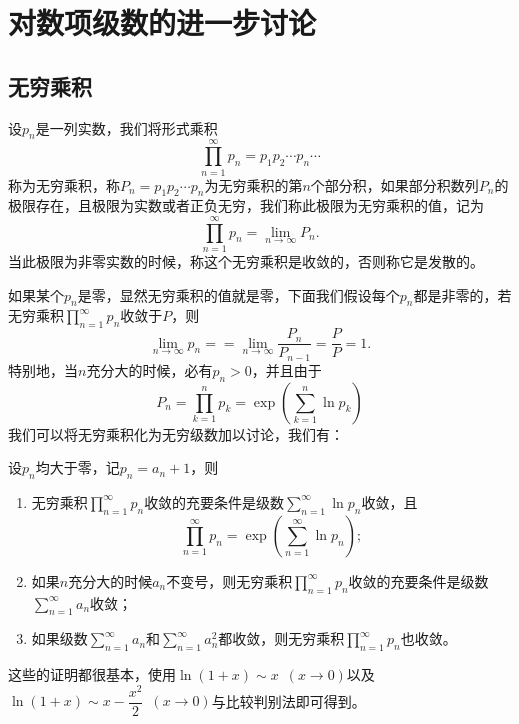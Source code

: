 \section{对数项级数的进一步讨论}
    \subsection{无穷乘积}
    \begin{definition}[无穷乘积]%
        设\({p_n}\)是一列实数，我们将形式乘积\[\prod_{n=1}^{\infty}p_n=p_1p_2\cdots p_n\cdots\]称为{\heiti 无穷乘积}，称\(P_n = p_1p_2\cdots p_n\)为无穷乘积的第\(n\)个{\heiti 部分积}，如果部分积数列\({P_n}\)的极限存在，且极限为实数或者正负无穷，我们称此极限为无穷乘积的值，记为\[\prod_{n = 1}^{\infty}p_n = \lim_{n\to\infty}P_n.\]
        当此极限为非零实数的时候，称这个无穷乘积是{\heiti 收敛}的，否则称它是{\heiti 发散}的。
    \end{definition}

    如果某个$p_n$是零，显然无穷乘积的值就是零，下面我们假设每个$p_n$都是非零的，若无穷乘积$\prod\limits_{n=1}^{\infty}p_n$收敛于\(P\)，则\[\lim_{n\to \infty}p_n = =\lim_{n\to\infty}\frac{P_n}{P_{n-1}} = \frac{P}{P} = 1.\]
    特别地，当\(n\)充分大的时候，必有\(p_n>0\)，并且由于\[P_n = \prod_{k=1}^{n}p_k = \exp\left(\sum\limits_{k=1}^{n}\ln p_k\right)\]我们可以将无穷乘积化为无穷级数加以讨论，我们有：

    \begin{theorem}
        设\(p_n\)均大于零，记\(p_n = a_n +1\)，则
        \begin{enumerate}
            \item 无穷乘积\(\prod\limits_{n=1}^{\infty}p_n\)收敛的充要条件是级数\(\sum\limits_{n=1}^{\infty}\ln p_n\)收敛，且\[\prod\limits_{n=1}^{\infty}p_n = \exp\left(\sum_{n=1}^{\infty}\ln p_n\right);\]
            \item 如果\(n\)充分大的时候\(a_n\)不变号，则无穷乘积\(\prod\limits_{n=1}^{\infty}p_n\)收敛的充要条件是级数\(\sum\limits_{n=1}^{\infty}a_n\)收敛；
            \item 如果级数\(\sum\limits_{n = 1}^{\infty}a_n\)和\(\sum\limits_{n = 1}^{\infty}a^2_n\)都收敛，则无穷乘积\(\prod\limits_{n=1}^{\infty}p_n\)也收敛。
        \end{enumerate}
    \end{theorem}

    这些的证明都很基本，使用\(\ln (1+x)\sim x\enspace(x\to0)\)以及\(\ln (1+x)\sim x-\dfrac{x^2}{2}\enspace(x\to0)\)与比较判别法即可得到。

